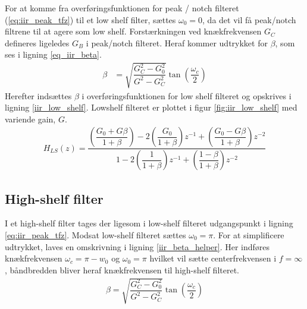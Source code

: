 	For at komme fra overføringsfunktionen for peak / notch filteret (\ref{eq:iir_peak_tfz}) til et low shelf filter, sættes $\omega_0 = 0$, da det vil få peak/notch filtrene til at agere som low shelf. 
	Forstærkningen ved knækfrekvensen $G_C$ defineres ligeledes $G_B$ i peak/notch filteret.
    Heraf kommer udtrykket for $\beta$, som ses i ligning \ref{eq_iir_beta}.
    \begin{align}
        \beta &= \sqrt{\dfrac{G_C^2 - G_0^2}{G^2 - G_C^2}} \tan \left( \dfrac{\omega_c}{2} \right) \label{eq_iir_beta}
    \end{align}
	Herefter indsættes $\beta$ i overføringsfunktionen for low shelf filteret og opskrives i ligning \ref{iir_low_shelf}. Lowshelf filteret er plottet i figur \ref{fig:iir_low_shelf} med variende gain, $G$.
     \begin{align}
      H_{LS}(z) =  \dfrac{\left(\dfrac{G_0 + G \beta}{1 + \beta} \right)- 2 \left(\dfrac{G_0 }{1 +\beta} \right)z^{-1} + \left(\dfrac{ G_0 - G \beta}{1 + \beta }\right) z^{-2}}{1 - 2 \left(\dfrac{1}{1 + \beta}\right)z^{-1} + \left( \dfrac{1 - \beta}{1 + \beta} \right) z^{-2}} \label{iir_low_shelf}
     \end{align}
   
   
     \subsection{High-shelf filter}
	I et high-shelf filter tages der ligesom i low-shelf filteret udgangspunkt i ligning \ref{eq:iir_peak_tfz}. Modsat low-shelf filteret sættes $\omega_0 = \pi$.
     For at simplificere udtrykket, laves en omskrivning i ligning \ref{iir_beta_helper}. Her indføres knækfrekvensen $\omega_c = \pi - w_0$ og $\omega_0 = \pi$ hvilket vil sætte centerfrekvensen i $f = \infty$, båndbredden bliver heraf knækfrekvensen til high-shelf filteret.
    \begin{align}
        \beta = \sqrt{\dfrac{G_C^2 - G_0^2}{G^2 - G_C^2}} \tan \left( \dfrac{\omega_c}{2} \right) \label{iir_beta_helper}
    \end{align}



